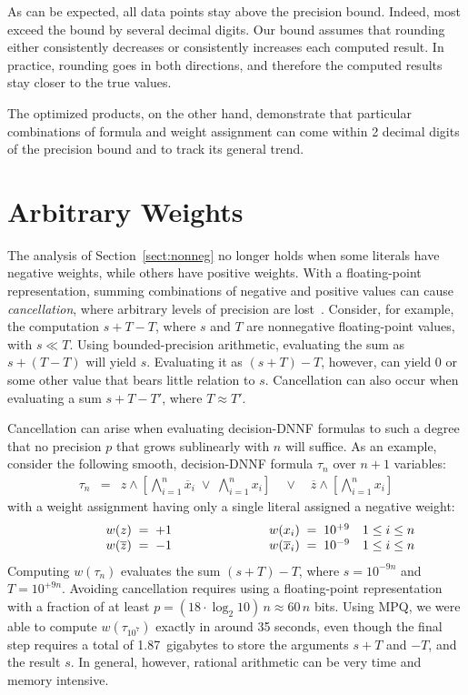 \documentclass[letterpaper,USenglish,cleveref, autoref, thm-restate]{lipics-v2021}
\newcommand{\obar}[1]{\overline{#1}}
\begin{document}
As can
be expected, all data points stay above the precision bound.  Indeed,
most exceed the bound by several decimal digits.  Our bound assumes
that rounding either consistently decreases or consistently
increases each computed result.  In practice, rounding goes in both directions, and
therefore the computed results stay closer to the true values.

The optimized products, on the other hand, demonstrate that particular
combinations of formula and weight assignment can come within 2 decimal digits of the
precision bound and to track its general trend.

\section{Arbitrary Weights}
\label{sect:neg}

The analysis of Section~\ref{sect:nonneg} no longer holds when
some literals have negative weights, while others have positive weights.  With a floating-point
representation, summing combinations of negative and positive
values can cause \emph{cancellation}, where arbitrary levels of
precision are lost~\cite{knuth:fp:1981}.  Consider, for example, the computation
$s + T - T$, where $s$ and $T$ are nonnegative floating-point values, with $s \ll T$.  Using
bounded-precision arithmetic, evaluating the sum as $s + (T - T)$ will yield $s$.
Evaluating it as $(s + T) - T$, however, can yield $0$ or some other value that bears little relation to $s$.
Cancellation can also occur when evaluating a sum $s + T - T'$, where $T \approx T'$.

Cancellation can arise when evaluating decision-DNNF formulas to such a degree that no precision $p$ that grows sublinearly with $n$ will suffice.
As an example, consider the following smooth, decision-DNNF formula $\tau_n$ over $n+1$ variables:
\begin{eqnarray}
\tau_n  & = & z \land \left[\bigwedge_{i = 1}^{n} \obar{x}_i \; \lor \; \bigwedge_{i = 1}^{n} x_i\right] \quad \lor \quad \obar{z} \land \left [\bigwedge_{i = 1}^{n} x_i\right] \label{eqn:max:precision}
\end{eqnarray}
with a weight assignment having only a single literal assigned a negative weight:
\begin{displaymath}
\begin{array}{lllll}
\makebox[1cm]{} &  w(z) \; = \; +1 & \makebox[2cm]{} &  w(x_i) \; = \; 10^{+9} & 1 \leq i \leq n \\
\makebox[1cm]{} &  w(\obar{z}) \; = \; -1 & &  w(\obar{x}_i) \; = \; 10^{-9} & 1 \leq i \leq n \\
\end{array}
\end{displaymath}
Computing $w(\tau_n)$  evaluates the sum $(s + T) - T$, where
$s = 10^{-9n}$ and $T = 10^{+9n}$.  Avoiding cancellation requires using a floating-point representation with a fraction of at least
$p = (18 \cdot \log_2 10)\, n \approx 60 \, n$ bits.
Using MPQ, we were able to compute $w(\tau_{10^7})$ exactly in around 35 seconds, even though the final step requires a total of 1.87~gigabytes to store the arguments
$s+T$ and $-T$, and the result $s$.  In general, however, rational arithmetic can be very time and memory intensive.
\end{document}
